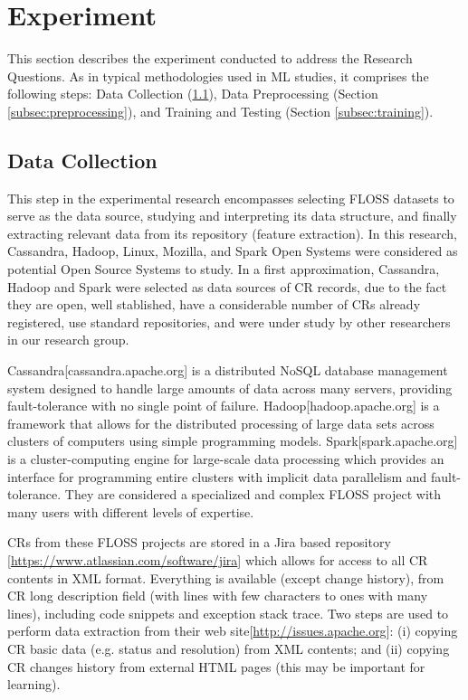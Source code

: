 \section{Experiment} \label{sec:experiment}
This section describes the experiment conducted to address the Research Questions. As in typical methodologies used in ML studies, it comprises the following steps: Data Collection (\ref{subsec:collection}), Data Preprocessing (Section \ref{subsec:preprocessing}), and Training and Testing (Section \ref{subsec:training}).

\subsection{Data Collection} 	\label{subsec:collection}
This step in the experimental research encompasses selecting FLOSS datasets to serve as the data source, studying and interpreting its data structure, and finally extracting relevant data from its repository (feature extraction). In this research, Cassandra, Hadoop, Linux, Mozilla, and Spark Open Systems were considered as potential Open Source Systems to study. In a first approximation, Cassandra, Hadoop and Spark were selected as data sources of CR records, due to the fact they are open, well stablished, have a considerable number of CRs already registered, use standard repositories, and were under study by other researchers in our research group.

Cassandra[cassandra.apache.org] is a distributed NoSQL database management system designed to handle large amounts of data across many servers, providing fault-tolerance with no single point of failure. Hadoop[hadoop.apache.org] is a framework that allows for the distributed processing of large data sets across clusters of computers using simple programming models. Spark[spark.apache.org] is a cluster-computing engine for large-scale data processing which provides an interface for programming entire clusters with implicit data parallelism and fault-tolerance. They are considered a specialized and complex FLOSS project with many users with different levels of expertise.

CRs from these FLOSS projects are stored in a Jira based repository [\url{https://www.atlassian.com/software/jira}] which allows for access to all CR contents in XML format. Everything is available (except change history), from CR long description field (with lines with few characters to ones with many lines), including code snippets and exception stack trace. Two steps are used to perform data extraction from their web site[\url{http://issues.apache.org}]: (i) copying CR basic data (e.g. status and resolution) from XML contents; and (ii) copying CR changes history from external HTML pages (this may be important for learning).

